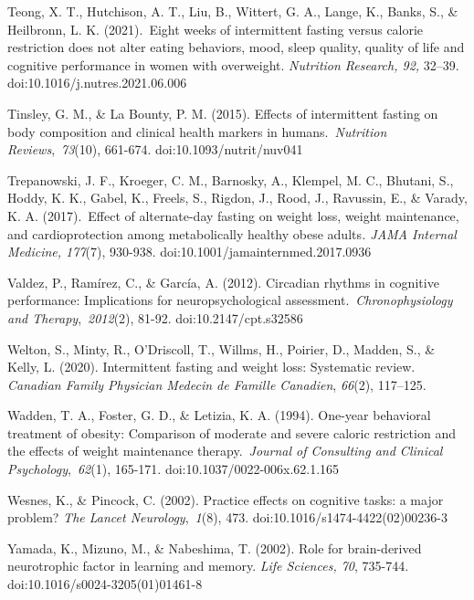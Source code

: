 \documentclass[authordate, empirical]{jote-new-article}
\begin{document}
Teong, X. T., Hutchison, A. T., Liu, B., Wittert, G. A., Lange, K., Banks, S., \& Heilbronn, L. K. (2021). Eight weeks of intermittent fasting versus calorie restriction does not alter eating behaviors, mood, sleep quality, quality of life and cognitive performance in women with overweight. \emph{Nutrition Research, 92, }32--39. doi:10.1016/j.nutres.2021.06.006



Tinsley, G. M., \& La Bounty, P. M. (2015). Effects of intermittent fasting on body composition and clinical health markers in humans. \emph{Nutrition Reviews}, \emph{73}(10), 661-674. doi:10.1093/nutrit/nuv041



Trepanowski, J. F., Kroeger, C. M., Barnosky, A., Klempel, M. C., Bhutani, S., Hoddy, K. K., Gabel, K., Freels, S., Rigdon, J., Rood, J., Ravussin, E., \& Varady, K. A. (2017). Effect of alternate-day fasting on weight loss, weight maintenance, and cardioprotection among metabolically healthy obese adults\emph{. JAMA Internal Medicine, 177}(7), 930-938. doi:10.1001/jamainternmed.2017.0936



Valdez, P., Ramírez, C., \& García, A. (2012). Circadian rhythms in cognitive performance: Implications for neuropsychological assessment. \emph{Chronophysiology and Therapy}, \emph{2012}(2), 81-92. doi:10.2147/cpt.s32586



Welton, S., Minty, R., O'Driscoll, T., Willms, H., Poirier, D., Madden, S., \& Kelly, L. (2020). Intermittent fasting and weight loss: Systematic review. \emph{Canadian Family Physician Medecin de Famille Canadien}, \emph{66}(2), 117--125.



Wadden, T. A., Foster, G. D., \& Letizia, K. A. (1994). One-year behavioral treatment of obesity: Comparison of moderate and severe caloric restriction and the effects of weight maintenance therapy. \emph{Journal of Consulting and Clinical Psychology}, \emph{62}(1), 165-171. doi:10.1037/0022-006x.62.1.165



Wesnes, K., \& Pincock, C. (2002). Practice effects on cognitive tasks: a major problem? \emph{The Lancet Neurology}, \emph{1}(8), 473. doi:10.1016/s1474-4422(02)00236-3



Yamada, K., Mizuno, M., \& Nabeshima, T. (2002). Role for brain-derived neurotrophic factor in learning and memory. \emph{Life Sciences, 70}, 735-744. doi:10.1016/s0024-3205(01)01461-8
\end{document}
